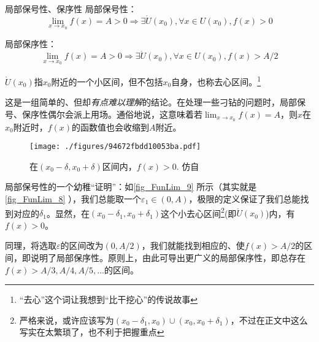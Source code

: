 \begin{theorem}{局部保号性、保序性}
局部保号性：
\begin{equation}
\lim_{x\to x_0}f(x)=A>0\Rightarrow \exists \mathring{U} (x_0), \forall x \in U(x_0), f(x)>0
\end{equation}

局部保序性：
\begin{equation}
\lim_{x\to x_0}f(x)=A>0 \Rightarrow \exists \mathring{U} (x_0), \forall x \in U(x_0), f(x)>A/2
\end{equation}

$\mathring{U} (x_0)$指$x_0$附近的一个小区间，但不包括$x_0$自身，也称去心区间。\footnote{“去心”这个词让我想到“比干挖心”的传说故事}

这是一组简单的、但却\textsl{有点难以理解}的结论。在处理一些刁钻的问题时，局部保号、保序性偶尔会派上用场。通俗地说，这意味着若$\lim_{x\to x_0}f(x)=A$，则$x$在$x_0$附近时，$f(x)$的函数值也会收缩到$A$附近。

\begin{figure}[ht]
\centering
\texttt{[image: ./figures/94672fbdd10053ba.pdf]}
\caption{在$(x_0-\delta, x_0+\delta)$区间内，$f(x)>0$. 仿自\cite{Thomas}} \label{fig_FunLim_9}
\end{figure}
局部保号性的一个幼稚“证明”：如\autoref{fig_FunLim_9} 所示（其实就是\autoref{fig_FunLim_8} ），我们总能取一个$\varepsilon_1 \in (0,A)$，极限的定义保证了我们总能找到对应的$\delta_1$。显然，在$(x_0-\delta_1, x_0+\delta_1)$这个小去心区间\footnote{严格来说，或许应该写为$(x_0-\delta_1,x_0)\cup(x_0, x_0+\delta_1)$，不过在正文中这么写实在太繁琐了，也不利于把握重点}(即$\mathring{U} ({x_0})$)内，有$f(x)>0$。

同理，将选取$\varepsilon$的区间改为$(0,A/2)$，我们就能找到相应的、使$f(x)>A/2$的区间，即说明了局部保序性。原则上，由此可导出更广义的局部保序性，即总存在$f(x)>A/3,A/4,A/5,...$的区间。

\end{theorem}